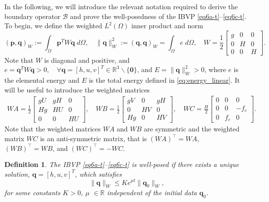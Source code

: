 \documentclass{article}
\numberwithin{equation}{section}
\newtheorem{definition}{Definition}
\theoremstyle{definition}
\begin{document}
In the following, we will introduce the relevant notation required to derive the boundary operator $\mathcal{B}$ and prove the well-posedness of the IBVP \eqref{eq6a-t}--\eqref{eq6c-t}. 
To begin, we define the weighted $L^2(\Omega)$ inner product and norm
\begin{equation}\label{eqn:L2norm}
 (\mathbf{p},\mathbf{q})_W := \int_{\Omega } \mathbf{p}^TW\mathbf{q} \; d\Omega, \quad  \|\mathbf{q}\|^2_W := (\mathbf{q},\mathbf{q})_W = \int_{\Omega } e \; d\Omega,   \quad 
 W =  \frac{1}{2}\begin{bmatrix}
g & 0 & 0\\
0 & H & 0\\
0 & 0 & H
\end{bmatrix}.
\end{equation}
Note that  $W$ is diagonal and positive, and $e=\mathbf{q}^TW\mathbf{q} >0, \quad \forall \mathbf{q} = [h,u,v]^T  \in \mathbb{R}^3 \backslash \{\mathbf{0}\}$, and $E=\|\mathbf{q}\|^2_W>0$, where $e$ is the elemental energy and $E$ is the total energy defined in \eqref{eq:energy_linear}. It will be useful to introduce the weighted matrices
%
\begin{align}
     \label{eqn:weighted-matrices}
WA = \frac{1}{2}\begin{bmatrix}
gU & gH & 0\\
Hg & HU & 0\\
0 & 0 & HU
\end{bmatrix}, \quad
WB = \frac{1}{2}\begin{bmatrix}
gV & 0 & gH\\
0 & HV & 0\\
Hg & 0 & HV
\end{bmatrix},
\quad
WC = \frac{H}{2}\begin{bmatrix}
0 & 0 & 0\\
0 & 0 & -f_c\\
0 & f_c & 0
\end{bmatrix}.
\end{align}
Note that the weighted matrices $WA$ and $WB$ are symmetric  and the weighted matrix $WC$ is an anti-symmetric matrix, that is $(WA)^\top=WA$, $(WB)^\top=WB$, and $(WC)^\top = - WC$.
\begin{definition}\label{eqn:wellposed}
The IBVP \eqref{eq6a-t}--\eqref{eq6c-t} is well-posed if there exists a unique solution, $\mathbf{q} = [h, u, v]^T$, which satisfies 
$$\| \mathbf{q}\|_W \leq K e^{\mu t}\| \mathbf{q}_0\|_W ,$$
for  some constants $K>0$, $\mu$ $\in \mathbb{R}$ independent of the initial data $\mathbf{q}_0$.
\end{definition}
\end{document}
